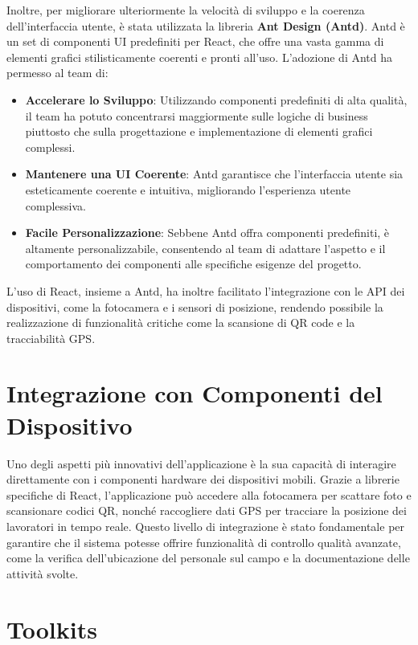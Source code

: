 \documentclass[twoside]{supsistudent}
\begin{document}
Inoltre, per migliorare ulteriormente la velocità di sviluppo e la coerenza dell'interfaccia utente, è stata utilizzata la libreria \textbf{Ant Design (Antd)}. Antd è un set di componenti UI predefiniti per React, che offre una vasta gamma di elementi grafici stilisticamente coerenti e pronti all'uso. L'adozione di Antd ha permesso al team di:

\begin{itemize}
  \item \textbf{Accelerare lo Sviluppo}: Utilizzando componenti predefiniti di alta qualità, il team ha potuto concentrarsi maggiormente sulle logiche di business piuttosto che sulla progettazione e implementazione di elementi grafici complessi.
  \item \textbf{Mantenere una UI Coerente}: Antd garantisce che l'interfaccia utente sia esteticamente coerente e intuitiva, migliorando l'esperienza utente complessiva.
  \item \textbf{Facile Personalizzazione}: Sebbene Antd offra componenti predefiniti, è altamente personalizzabile, consentendo al team di adattare l'aspetto e il comportamento dei componenti alle specifiche esigenze del progetto.
\end{itemize}

L'uso di React, insieme a Antd, ha inoltre facilitato l'integrazione con le API dei dispositivi, come la fotocamera e i sensori di posizione, rendendo possibile la realizzazione di funzionalità critiche come la scansione di QR code e la tracciabilità GPS.

\section{Integrazione con Componenti del Dispositivo}

Uno degli aspetti più innovativi dell'applicazione è la sua capacità di interagire direttamente con i componenti hardware dei dispositivi mobili. Grazie a librerie specifiche di React, l'applicazione può accedere alla fotocamera per scattare foto e scansionare codici QR, nonché raccogliere dati GPS per tracciare la posizione dei lavoratori in tempo reale. Questo livello di integrazione è stato fondamentale per garantire che il sistema potesse offrire funzionalità di controllo qualità avanzate, come la verifica dell'ubicazione del personale sul campo e la documentazione delle attività svolte.

\section{Toolkits}
\end{document}
